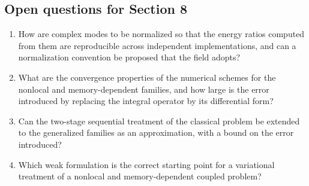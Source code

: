 \subsection{Open questions for Section 8}

\begin{enumerate}[label=\textbf{OQ8.\arabic*}]
\item How are complex modes to be normalized so that the energy ratios computed from them are reproducible across independent implementations, and can a normalization convention be proposed that the field adopts? \label{oq:8.1}
\item What are the convergence properties of the numerical schemes for the nonlocal and memory-dependent families, and how large is the error introduced by replacing the integral operator by its differential form? \label{oq:8.2}
\item Can the two-stage sequential treatment of the classical problem be extended to the generalized families as an approximation, with a bound on the error introduced? \label{oq:8.3}
\item Which weak formulation is the correct starting point for a variational treatment of a nonlocal and memory-dependent coupled problem? \label{oq:8.4}
\end{enumerate}

